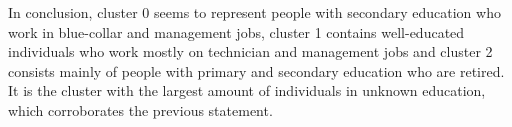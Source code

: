 \documentclass[12pt]{article}
\begin{document}
\begin{enumerate}
\begin{enumerate}[label=\alph*)]
        In conclusion, cluster 0 seems to represent people with secondary education who work in blue-collar and management jobs, 
        cluster 1 contains well-educated individuals who work mostly on technician and management jobs and cluster 2 consists 
        mainly of people with primary and secondary education who are retired. It is the cluster with the largest amount of individuals
        in unknown education, which corroborates the previous statement.
        
    \end{enumerate}

\end{enumerate}
\end{document}
